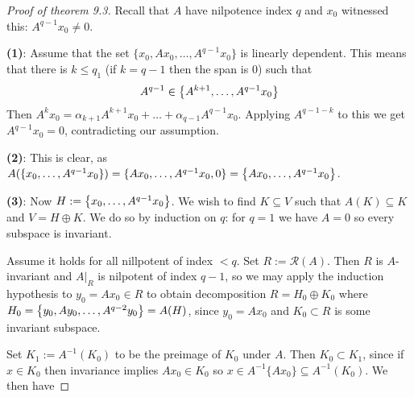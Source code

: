 \documentclass[10pt,twoside,openany,final]{memoir}
\theoremstyle{break}
\theoremstyle{Break}
\newcommand{\Rg}{\mathcal{R}}
\let\Span\relax
\DeclareMathOperator{\Span}{Span}
\begin{document}
\begin{proof}[Proof of theorem 9.3]
	Recall that $A$ have nilpotence index $q$ and $x_0$ witnessed this: $A^{q-1}x_0\neq 0$.

	\textbf{(1)}: Assume that the set $\{x_0,Ax_0,\dots,A^{q-1}x_0\}$ is linearly dependent. This means that there is $k \leq q_1$ (if $k=q-1$ then the span is $0$) such that 
	\begin{align*}
		A^{q-1} \in \Span\left\{ A^{k+1},\dots,A^{q-1}x_0 \right\}
	\end{align*}
	Then $A^kx_0=\alpha_{k+1} A^{k+1}x_0+\dots+\alpha_{q-1}A^{q-1}x_0$. Applying $A^{q-1-k}$ to this we get $A^{q-1}x_0=0$, contradicting our assumption.
	
	\textbf{(2)}: This is clear, as $A(\Span\{x_0,\dots,A^{q-1}x_0\})=\Span\{Ax_0,\dots,A^{q-1}x_0,0\}=\Span\left\{ Ax_0,\dots,A^{q-1}x_0 \right\}$.

	\textbf{(3)}: Now $H:=\Span\left\{ x_0,\dots,A^{q-1}x_0 \right\}$. We wish to find $K \subseteq V$ such that $A(K) \subseteq K$ and $V=H\oplus K$. We do so by induction on $q$: for $q=1$ we have $A=0$ so every subspace is invariant.

	Assume it holds for all nillpotent of index $<q$. Set $R:=\Rg(A)$. Then $R$ is $A$-invariant and $A\big|_R$ is nilpotent of index $q-1$, so we may apply the induction hypothesis to $y_0=Ax_0 \in R$ to obtain decomposition $R=H_0 \oplus K_0$ where $H_0=\Span\left\{ y_0, Ay_0,\dots,A^{q-2}y_0 \right\}=A(H)$, since $y_0=Ax_0$ and $K_0 \subset R$ is some invariant subspace. 
	
	Set $K_1 := A^{-1}(K_0)$ to be the preimage of $K_0$ under $A$. Then $K_0 \subset K_1$, since if $x \in K_0$ then invariance implies $Ax_0 \in K_0$ so $x \in A^{-1}\{Ax_0\} \subseteq A^{-1}(K_0)$. We then have


\end{proof}
\end{document}
